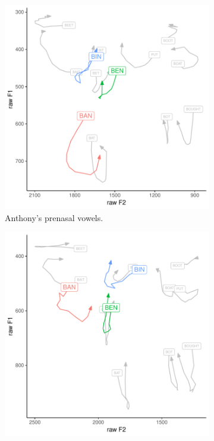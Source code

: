 \begin{figure}[tb!]
    \centering
    \hspace{\fill}
     \begin{subfigure}[t]{2.925in}
        \centering
        \includegraphics[width = \textwidth]{Figures/example_plots/07-Anthony_avg_prenasal.pdf}
        \caption{Anthony's prenasal vowels.}
        \label{fig:anthony_prenasal}
    \end{subfigure}
    \hspace{\fill}
    \begin{subfigure}[t]{2.925in}
        \centering
        \includegraphics[width = \textwidth]{Figures/example_plots/05-Megan_avg_prenasal.pdf}

\end{subfigure}
\end{figure}
